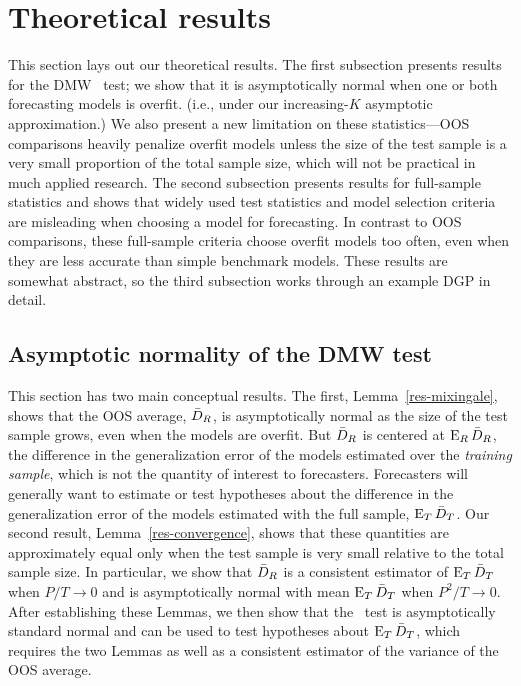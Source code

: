 \section{Theoretical results}
\label{sec:theory}

This section lays out our theoretical results. The first subsection
presents results for the DMW \oost\ test; we show that it is
asymptotically normal when one or both forecasting models is overfit.
(i.e., under our increasing-$K$ asymptotic approximation.) We also
present a new limitation on these statistics---OOS comparisons heavily
penalize overfit models unless the size of the test sample is a very
small proportion of the total sample size, which will not be practical
in much applied research. The second subsection presents results for
full-sample statistics and shows that widely used test statistics and
model selection criteria are misleading when choosing a model for
forecasting. In contrast to OOS comparisons, these full-sample
criteria choose overfit models too often, even when they are less
accurate than simple benchmark models. These results are somewhat
abstract, so the third subsection works through an example DGP in
detail.

\subsection{Asymptotic normality of the DMW test}
\label{sec:oostheory}

This section has two main conceptual results. The first,
Lemma~\ref{res-mixingale}, shows that the OOS average, $\bar{D}_{R}$, is
asymptotically normal as the size of the test sample grows, even when
the models are overfit. But $\bar{D}_{R}$ is centered at $\operatorname{E}_R \bar{D}_{R}$, the
difference in the generalization error of the models estimated over
the \emph{training sample}, which is not the quantity of interest to
forecasters. Forecasters will generally want to estimate or test
hypotheses about the difference in the generalization error of the
models estimated with the full sample, $\operatorname{E}_T \bar{D}_{T}$. Our second
result, Lemma~\ref{res-convergence}, shows that these quantities are
approximately equal only when the test sample is very small relative
to the total sample size. In particular, we show that $\bar{D}_{R}$ is a
consistent estimator of $\operatorname{E}_T \bar{D}_{T}$ when $P/T \to 0$ and is
asymptotically normal with mean $\operatorname{E}_T \bar{D}_{T}$ when $P^2/T \to 0$. After
establishing these Lemmas, we then show that the \oost\ test is
asymptotically standard normal and can be used to test hypotheses
about $\operatorname{E}_T \bar{D}_{T}$, which requires the two Lemmas as well as a
consistent estimator of the variance of the OOS average.

